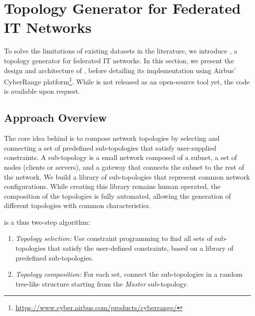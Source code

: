 \section{Topology Generator for Federated IT Networks\label{sec:topologies.approach}}

To solve the limitations of existing datasets in the literature, we introduce \thecontrib, a topology generator for federated IT networks.
In this section, we present the design and architecture of \thecontrib, before detailing its implementation using Airbus' CyberRange platform\footnote{\url{https://www.cyber.airbus.com/products/cyberrange/}}.
While \thecontrib is not released as an open-source tool yet, the code is available upon request.


\subsection{Approach Overview\label{sec:topologies.approach.overview}}

The core idea behind \thecontrib is to compose network topologies by selecting and connecting a set of predefined sub-topologies that satisfy user-supplied constraints.
A sub-topology is a small network composed of a subnet, a set of nodes (clients or servers), and a gateway that connects the subnet to the rest of the network.
We build a library of sub-topologies that represent common network configurations.
While creating this library remains human operated, the composition of the topologies is fully automated, allowing the generation of different topologies with common characteristics.

\thecontrib is a thus two-step algorithm:
\begin{enumerate}
  \item \emph{Topology selection:} Use constraint programming to find all sets of sub-topologies that satisfy the user-defined constraints, based on a library of predefined sub-topologies.
  \item \emph{Topology composition:} For each set, connect the sub-topologies in a random tree-like structure starting from the \emph{Master} sub-topology.
\end{enumerate}


